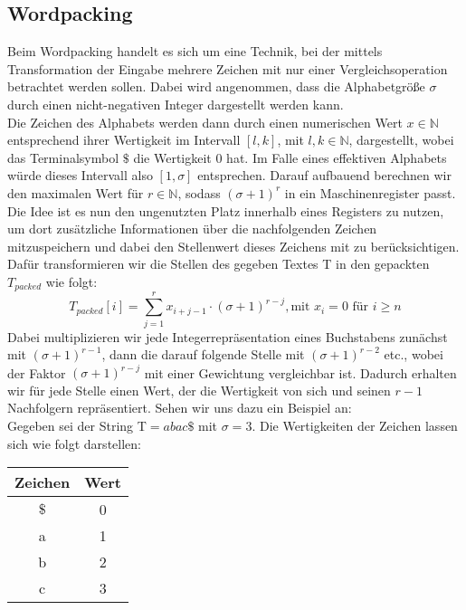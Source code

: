 \subsection{Wordpacking}
\label{wordpacking}
Beim Wordpacking \cite{Manber1993} handelt es sich um eine Technik, bei der mittels Transformation der Eingabe mehrere Zeichen mit nur einer Vergleichsoperation betrachtet werden sollen. Dabei wird angenommen, dass die Alphabetgröße $\sigma$ durch einen nicht-negativen Integer dargestellt werden kann.\\
Die Zeichen des Alphabets werden dann durch einen numerischen Wert $x \in \mathbb{N}$  entsprechend ihrer Wertigkeit im Intervall $[l,k]$,  mit $l,k \in \mathbb{N}$, dargestellt, wobei das Terminalsymbol $\$$ die Wertigkeit 0 hat. Im Falle eines effektiven Alphabets würde dieses Intervall also $[1,\sigma]$ entsprechen. Darauf aufbauend berechnen wir den maximalen Wert für $r \in \mathbb{N}$, sodass $(\sigma+1)^r$ in ein Maschinenregister passt.\\
Die Idee ist es nun den ungenutzten Platz innerhalb eines Registers zu nutzen, um dort zusätzliche Informationen über die nachfolgenden Zeichen mitzuspeichern und dabei den Stellenwert dieses Zeichens mit zu berücksichtigen. Dafür transformieren wir die Stellen des gegeben Textes T in den gepackten $T_{packed}$ wie folgt:
\begin{equation}
T_{packed}[i]= \sum_{j=1}^r x_{i+j-1}\cdot(\sigma+1)^{r-j}, \text{mit }  x_i =0 \text{ für } i\geq n
\end{equation}
Dabei multiplizieren wir jede Integerrepräsentation eines Buchstabens zunächst mit $(\sigma+1)^{r-1}$, dann die darauf folgende Stelle mit $(\sigma+1)^{r-2}$ etc., wobei der Faktor $(\sigma+1)^{r-j}$ mit einer Gewichtung vergleichbar ist. Dadurch erhalten wir für jede Stelle einen Wert, der die Wertigkeit von sich und seinen $r-1$ Nachfolgern repräsentiert. Sehen wir uns dazu ein Beispiel an:\\
Gegeben sei der String T$ = abac\$$ mit $\sigma=3$. Die Wertigkeiten der Zeichen lassen sich wie folgt darstellen: 
\begin{center}
\begin{tabular}{c | c}
Zeichen & Wert \\
\hline
$\$$ & 0 \\
a & 1 \\
b & 2 \\
c & 3 
\end{tabular}
\end{center}

